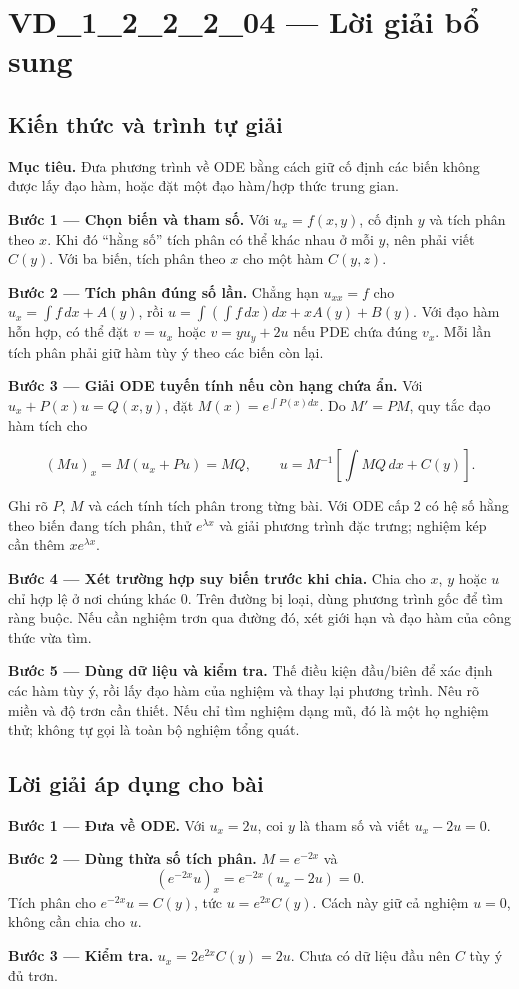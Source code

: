 \documentclass[10pt,a4paper]{article}
\begin{document}
\section*{VD\_1\_2\_2\_2\_04 — Lời giải bổ sung}
\subsection*{Kiến thức và trình tự giải}
\textbf{Mục tiêu.} Đưa phương trình về ODE bằng cách giữ cố định các biến không được lấy đạo hàm, hoặc đặt một đạo hàm/hợp thức trung gian.

\textbf{Bước 1 — Chọn biến và tham số.} Với $u_x=f(x,y)$, cố định $y$ và tích phân theo $x$. Khi đó “hằng số” tích phân có thể khác nhau ở mỗi $y$, nên phải viết $C(y)$. Với ba biến, tích phân theo $x$ cho một hàm $C(y,z)$.

\textbf{Bước 2 — Tích phân đúng số lần.} Chẳng hạn $u_{xx}=f$ cho $u_x=\int f\,dx+A(y)$, rồi $u=\int(\int f\,dx)dx+xA(y)+B(y)$. Với đạo hàm hỗn hợp, có thể đặt $v=u_x$ hoặc $v=yu_y+2u$ nếu PDE chứa đúng $v_x$. Mỗi lần tích phân phải giữ hàm tùy ý theo các biến còn lại.

\textbf{Bước 3 — Giải ODE tuyến tính nếu còn hạng chứa ẩn.} Với $u_x+P(x)u=Q(x,y)$, đặt $M(x)=e^{\int P(x)dx}$. Do $M'=PM$, quy tắc đạo hàm tích cho

\[
(Mu)_x=M(u_x+Pu)=MQ,\qquad
u=M^{-1}\left[\int MQ\,dx+C(y)\right].
\]

Ghi rõ $P$, $M$ và cách tính tích phân trong từng bài. Với ODE cấp 2 có hệ số hằng theo biến đang tích phân, thử $e^{\lambda x}$ và giải phương trình đặc trưng; nghiệm kép cần thêm $xe^{\lambda x}$.

\textbf{Bước 4 — Xét trường hợp suy biến trước khi chia.} Chia cho $x$, $y$ hoặc $u$ chỉ hợp lệ ở nơi chúng khác 0. Trên đường bị loại, dùng phương trình gốc để tìm ràng buộc. Nếu cần nghiệm trơn qua đường đó, xét giới hạn và đạo hàm của công thức vừa tìm.

\textbf{Bước 5 — Dùng dữ liệu và kiểm tra.} Thế điều kiện đầu/biên để xác định các hàm tùy ý, rồi lấy đạo hàm của nghiệm và thay lại phương trình. Nêu rõ miền và độ trơn cần thiết. Nếu chỉ tìm nghiệm dạng mũ, đó là một họ nghiệm thử; không tự gọi là toàn bộ nghiệm tổng quát.
\subsection*{Lời giải áp dụng cho bài}
\textbf{Bước 1 — Đưa về ODE.} Với $u_x=2u$, coi $y$ là tham số và viết $u_x-2u=0$.

\textbf{Bước 2 — Dùng thừa số tích phân.} $M=e^{-2x}$ và
\[(e^{-2x}u)_x=e^{-2x}(u_x-2u)=0.\]
Tích phân cho $e^{-2x}u=C(y)$, tức $u=e^{2x}C(y)$. Cách này giữ cả nghiệm $u=0$, không cần chia cho $u$.

\textbf{Bước 3 — Kiểm tra.} $u_x=2e^{2x}C(y)=2u$. Chưa có dữ liệu đầu nên $C$ tùy ý đủ trơn.
\end{document}
